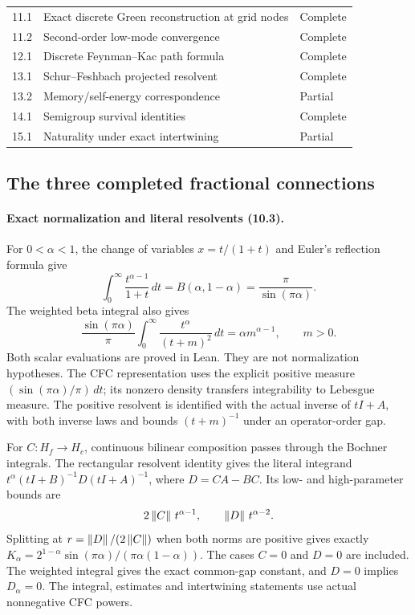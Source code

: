 \begin{longtable}{@{}p{}p{}p{}@{}}
11.1 & Exact discrete Green reconstruction at grid nodes & Complete\\
11.2 & Second-order low-mode convergence & Complete\\
12.1 & Discrete Feynman--Kac path formula & Complete\\
13.1 & Schur--Feshbach projected resolvent & Complete\\
13.2 & Memory/self-energy correspondence & Partial\\
14.1 & Semigroup survival identities & Complete\\
15.1 & Naturality under exact intertwining & Partial\\
\end{longtable}
\normalsize

\subsection*{The three completed fractional connections}
\paragraph{Exact normalization and literal resolvents (10.3).}
For $0<\alpha<1$, the change of variables $x=t/(1+t)$ and Euler's reflection
formula give
\[
\int_0^\infty\frac{t^{\alpha-1}}{1+t}\,dt
=B(\alpha,1-\alpha)=\frac{\pi}{\sin(\pi\alpha)}.
\]
The weighted beta integral also gives
\[
\frac{\sin(\pi\alpha)}{\pi}
\int_0^\infty\frac{t^\alpha}{(t+m)^2}\,dt
=\alpha m^{\alpha-1},\qquad m>0.
\]
Both scalar evaluations are proved in Lean. They are not normalization hypotheses.
The CFC representation uses the explicit positive measure
$(\sin(\pi\alpha)/\pi)\,dt$; its nonzero density transfers integrability to
Lebesgue measure. The positive resolvent is identified with the actual inverse
of $tI+A$, with both inverse laws and bounds $(t+m)^{-1}$ under an operator-order gap.

For $C:H_f\to H_c$, continuous bilinear composition passes through the Bochner
integrals. The rectangular resolvent identity gives the literal integrand
$t^\alpha(tI+B)^{-1}D(tI+A)^{-1}$, where $D=CA-BC$.
Its low- and high-parameter bounds are
\[
2\left\lVert C\right\rVert\,t^{\alpha-1},\qquad \left\lVert D\right\rVert\,t^{\alpha-2}.
\]
Splitting at $r=\left\lVert D\right\rVert/(2\left\lVert C\right\rVert)$ when both norms are positive gives exactly
$K_\alpha=2^{1-\alpha}\sin(\pi\alpha)/(\pi\alpha(1-\alpha))$.
The cases $C=0$ and $D=0$ are included. The weighted integral gives the exact
common-gap constant, and $D=0$ implies $D_\alpha=0$.
The integral, estimates and intertwining statements use actual nonnegative CFC powers.

